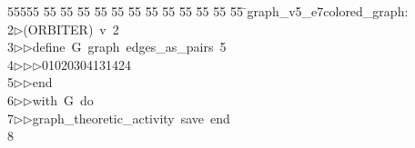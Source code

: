 %
%
\begin{tabbing}
55555 \= 55 \= 55 \= 55 \= 55 \= 55 \= 55 \= 55 \= 55 \= 55 \= 55 \= 55 \= 55 \= \>graph\_v5\_e7colored\_graph:\\[0pt]
2\>$\triangleright$\>(ORBITER)\ v\ 2\ \\[0pt]
3\>$\triangleright$\>$\triangleright$\>define\ G\ graph\ edges\_as\_pairs\ 5\ \\[0pt]
4\>$\triangleright$\>$\triangleright$\>$\triangleright$\>01020304131424\ \\[0pt]
5\>$\triangleright$\>$\triangleright$\>end\ \\[0pt]
6\>$\triangleright$\>$\triangleright$\>with\ G\ do\ \\[0pt]
7\>$\triangleright$\>$\triangleright$\>graph\_theoretic\_activity\ save\ end\\[0pt]
8\>\end{tabbing}
